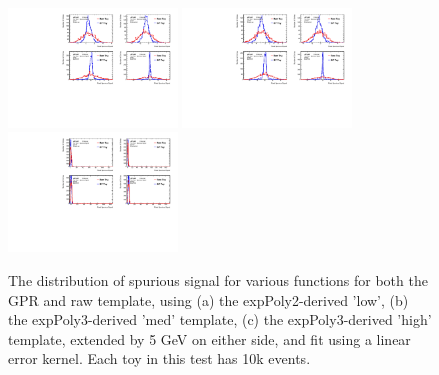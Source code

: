 \begin{figure} 
\begin{center}
  \includegraphics[width=0.4\textwidth]{figures/background/gpr/validation/linear/ToyTest_FitSigVals_lowpT_10k_noSig}   
  \includegraphics[width=0.4\textwidth]{figures/background/gpr/validation/linear/ToyTest_FitSigVals_medpT_10k_noSig}   
  \includegraphics[width=0.4\textwidth]{figures/background/gpr/validation/linear/ToyTest_FitSigVals_highpT_10k_noSig}   
\caption{The distribution of spurious signal for various functions for both the GPR and raw template, using (a) the expPoly2-derived 'low', (b) the expPoly3-derived 'med' template, (c) the expPoly3-derived 'high' template, extended by 5 GeV on either side, and fit using a linear error kernel. Each toy in this test has 10k events.}
\label{fig:linearkernel_lowpt_10k_noSig}
\end{center}
\end{figure}

